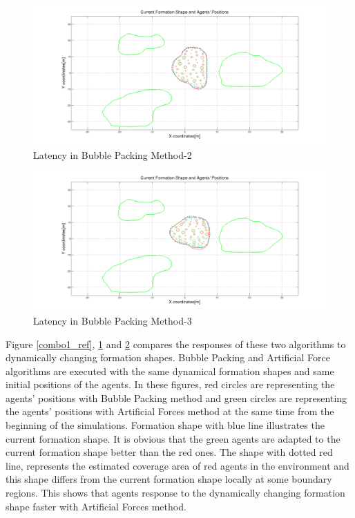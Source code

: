\begin{figure}[H]
\caption{Latency in Bubble Packing Method-2} \label{combo2_ref}
\centerline{\includegraphics[scale = 0.30]{combo2}}
\end{figure} 

\begin{figure}[H]
\caption{Latency in Bubble Packing Method-3} \label{combo3_ref}
\centerline{\includegraphics[scale = 0.30]{combo3}}
\end{figure} 

Figure \ref{combo1_ref}, \ref{combo2_ref} and \ref{combo3_ref} compares the responses of these two algorithms to dynamically changing formation shapes. Bubble Packing and Artificial Force algorithms are executed with the same dynamical formation shapes and same initial positions of the agents. In these figures, red circles are representing the agents' positions with Bubble Packing method and green circles are representing the agents' positions with Artificial Forces method at the same time from the beginning of the simulations. Formation shape with blue line illustrates the current formation shape. It is obvious that the green agents are adapted to the current formation shape better than the red ones. The shape with dotted red line, represents the estimated coverage area of red agents in the environment and this shape differs from the current formation shape locally at some boundary regions. This shows that agents response to the dynamically changing formation shape faster with Artificial Forces method. 

